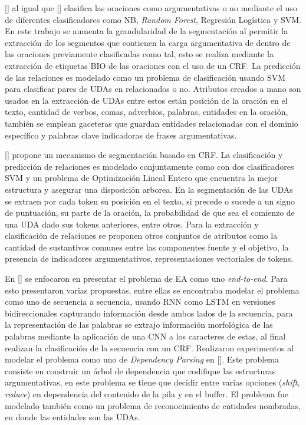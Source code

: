 [\cite{goudas2015argument}] al igual que [\cite{palau2009argumentation}] clasifica las oraciones como
argumentativas o no mediante el uso de diferentes clasificadores como NB, \emph{Random Forest}, Regresión
Logística y SVM. En este trabajo se aumenta la grandularidad de la segmentación al permitir
la extracción de los segmentos que contienen la carga argumentativa de dentro de las oraciones previamente clasificadas
como tal, esto se realiza mediante la extracción de etiquetas BIO de las oraciones con el uso de un 
CRF. La predicción de las relaciones es modelado como un problema de clasificación
usando SVM para clasificar pares de UDAs en relacionados o no. Atributos creados a mano 
son usados en la extracción de UDAs entre estos están posición de la oración en el texto, cantidad de verbos, comas, adverbios,
palabras, entidades en la oración, también se emplean gaceteras que guardan entidades relacionadas con el dominio 
específico y palabras clave indicadoras de frases argumentativas. 

[\cite{stab2017parsing}] propone un mecanismo de segmentación basado en CRF. La clasificación
y predicción de relaciones es modelado conjuntamente como con dos clasificadores SVM y un problema
de Optimización Lineal Entero que encuentra la mejor estructura y asegurar una disposición arborea. En la segmentación
de las UDAs se extraen por cada token su posición en el texto, si precede o sucede a un signo de puntuación, su parte de
la oración, la probabilidad de que sea el comienzo de una UDA dado sus tokens anteriores, entre otros. Para la extracción
y clasificación de relaciones se proponen otros conjuntos de atributos como la cantidad de sustantivos comunes entre
las componentes fuente y el objetivo, la presencia de indicadores argumentativos, representaciones vectoriales de tokens.

En [\cite{eger2017neural}] se enfocaron en presentar el problema de EA como uno \emph{end-to-end}. 
Para esto presentaron varias propuestas, entre ellas se encontraba
modelar el problema como uno de secuencia a secuencia, usando RNN como 
LSTM en versiones bidireccionales capturando información desde ambos lados de la secuencia,
para la representación de las palabras se extrajo información morfológica de las palabras mediante 
la aplicación de una CNN a los caracteres de estas,
al final realizan la clasificación de la secuencia con un CRF. 
Realizaron experimentos al modelar el problema como uno de \emph{Dependency Parsing} en [\cite{kiperwasser2016simple}]. Este problema
consiste en construir un árbol de dependencia que codifique las estructuras argumentativas, en este problema 
se tiene que decidir entre varias opciones (\emph{shift}, \emph{reduce}) en dependencia del contenido de la pila y en el buffer.
El problema fue modelado también como un problema de reconocimiento de entidades nombradas, en donde las entidades son las UDAs.

